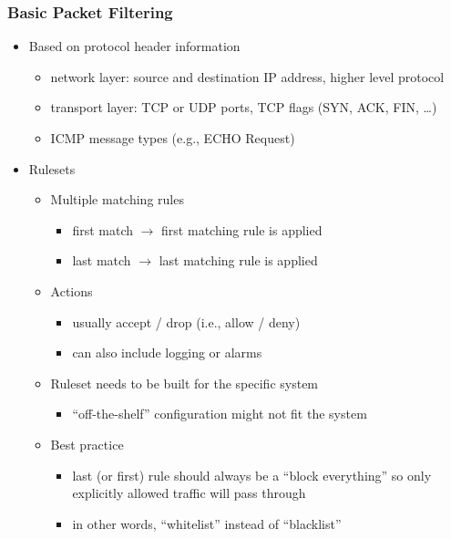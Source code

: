 \documentclass[final]{article}
\begin{document}
\subsubsection*{Basic Packet Filtering}
\begin{itemize}[nosep]
    \item Based on protocol header information
          \begin{itemize}[nosep]
              \item network layer: source and destination IP address, higher level protocol
              \item transport layer: TCP or UDP ports, TCP flags (SYN, ACK, FIN, \dots)
              \item ICMP message types (e.g., ECHO Request)
          \end{itemize}
    \item Rulesets
          \begin{itemize}
              \item Multiple matching rules
                    \begin{itemize}[nosep]
                        \item first match $\rightarrow$ first matching rule is applied
                        \item last match $\rightarrow$ last matching rule is applied
                    \end{itemize}
              \item Actions
                    \begin{itemize}[nosep]
                        \item usually accept / drop (i.e., allow / deny)
                        \item can also include logging or alarms
                    \end{itemize}
              \item Ruleset needs to be built for the specific system
                    \begin{itemize}[nosep]
                        \item ``off-the-shelf'' configuration might not fit the system
                    \end{itemize}
              \item Best practice
                    \begin{itemize}
                        \item last (or first) rule should always be a ``block everything'' so only explicitly allowed traffic will pass through
                        \item in other words, ``whitelist'' instead of ``blacklist''
                    \end{itemize}
          \end{itemize}
\end{itemize}
\end{document}

